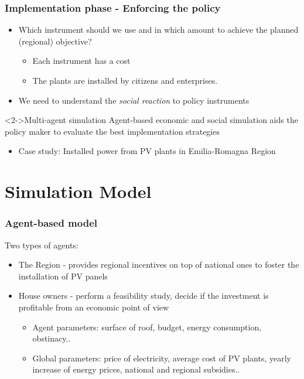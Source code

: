 \documentclass{beamer}
\begin{document}
	\begin{frame}
	\frametitle{Implementation phase - Enforcing the policy}
		\begin{itemize}
		\item Which instrument should we use and in which amount to achieve the planned (regional) objective?
			\begin{itemize}
				\item Each instrument has a cost
				\item The plants are installed by citizens and enterprises.
			\end{itemize}
		\item We need to understand the \emph{social reaction} to policy instruments
		\end{itemize}
		\begin{block}<2->{Multi-agent simulation}
		Agent-based economic and social simulation aids the policy maker to evaluate the best implementation strategies 
		\begin{itemize}
			\item Case study: Installed power from PV plants in Emilia-Romagna Region 
		\end{itemize}
		\end{block}
	\end{frame}
		
  	
\section{Simulation Model}
	  	
  	\begin{frame}
	\frametitle{Agent-based model}
	Two types of agents:
		\begin{itemize}
		\item The Region - provides regional incentives on top of national ones to foster the installation of PV panels	
		\item House owners - perform a feasibility study, decide if the investment is profitable from an economic point of view
			\begin{itemize}
			\item Agent parameters: surface of roof, budget, energy consumption, obstinacy..
			\item Global parameters: price of electricity, average cost of PV plants, yearly increase of energy prices, national and regional subsidies..
			\end{itemize}
		\end{itemize}
  	\end{frame}
  	
\end{document}
